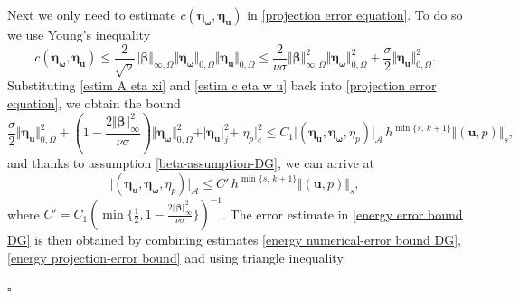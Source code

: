 \documentclass[reqno,a4paper]{article}
\numberwithin{equation}{section}
\newcommand\bu{\boldsymbol{u}}
\newcommand\bbbeta{\boldsymbol{\beta}}
\renewcommand\O{\Omega}
\newcommand\bomega{\boldsymbol{\omega}}
\newcommand\betta{\boldsymbol{\eta}}
\newenvironment{proof}{\noindent{\it Proof.}}{\hfill$\square$}
\begin{document}
\begin{proof}
%
Next we only need to estimate  $c(\betta_{\bomega},\betta_{\bu})$
in \eqref{projection error equation}. To do so we use Young's inequality
\begin{equation}\label{estim c eta w u}
 c(\betta_{\bomega},\betta_{\bu})\leq \frac{2}{\sqrt{\nu}}\Vert\bbbeta\Vert_{\infty,\O}
 \Vert\betta_{\bomega}\Vert_{0,\O}\Vert\betta_{\bu}\Vert_{0,\O} \leq
 \frac{2}{\nu\sigma}\Vert\bbbeta\Vert_{\infty,\O}^{2}\Vert\betta_{\bomega}\Vert_{0,\O}^{2}
 +\frac{\sigma}{2}\Vert\betta_{\bu}\Vert_{0,\O}^{2}.
 \end{equation}
Substituting \eqref{estim A eta xi} and \eqref{estim c eta w u} back into \eqref{projection error equation}, we obtain the bound 
\begin{equation*}
 \frac{\sigma}{2}\Vert\betta_{\bu}\Vert_{0,\O}^{2}+(1-\frac{2\Vert\bbbeta\Vert_{\infty}^2}{\nu\sigma})\Vert\betta_{\bomega}\Vert_{0,\O}^{2}
 +\vert\betta_{\bu}\vert_{j}^{2}+\vert \eta_{p}\vert_{e}^{2}\leq
 C_{1} \vert(\betta_{\bu} ,\betta_{\bomega},\eta_p)\vert_{\mathcal{A}} \,h^{\min\{s,\,k+1\}}\Vert(\bu,p)\Vert_{s},
\end{equation*}
and thanks to assumption \eqref{beta-assumption-DG}, we can arrive at 
\begin{equation}\label{energy projection-error bound}
 \vert(\betta_{\bu} ,\betta_{\bomega},\eta_p)\vert_{\mathcal{A}}\leq
 C'\,h^{\min\{s,\,k+1\}}\Vert(\bu,p)\Vert_{s},
\end{equation}
where $C'=C_{1}(\min\{\frac{1}{2},1-\frac{2\Vert\bbbeta\Vert_{\infty}^2}{\nu\sigma}\})^{-1}$.
The error estimate in \eqref{energy error bound DG} is then obtained
by combining estimates \eqref{energy numerical-error bound DG}, \eqref{energy projection-error bound} and using triangle inequality.\medskip


\end{proof}
\end{document}
